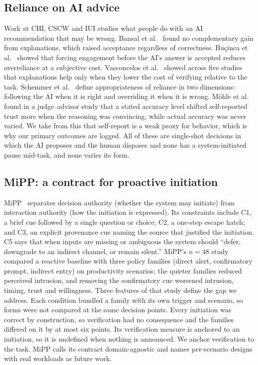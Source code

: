 \documentclass[manuscript,review]{acmart}
\begin{document}
\subsection{Reliance on AI advice}
Work at CHI, CSCW and IUI studies what people do with an AI recommendation
that may be wrong. Bansal et al.~\cite{bansal2021} found no complementary
gain from explanations, which raised acceptance regardless of correctness.
Bu\c{c}inca et al.~\cite{bucinca2021} showed that forcing engagement before
the AI's answer is accepted reduces overreliance at a subjective cost.
Vasconcelos et al.~\cite{vasconcelos2023} showed across five studies that
explanations help only when they lower the cost of verifying relative to
the task. Schemmer et al.~\cite{schemmer2023} define appropriateness of
reliance in two dimensions: following the AI when it is right and
overriding it when it is wrong. M\"ohle et al.~\cite{mohle2026} found in a
judge--advisor study that a stated accuracy level shifted self-reported
trust more when the reasoning was convincing, while actual accuracy was
never varied. We take from this that self-report is a weak proxy for
behavior, which is why our primary outcomes are logged. All of these are
single-shot decisions in which the AI proposes and the human disposes and none
has a system-initiated pause mid-task, and none varies its form.

\subsection{MiPP: a contract for proactive initiation}
MiPP~\cite{sanchezadame2026} separates decision authority (whether the
system may initiate) from interaction authority (how the initiation is
expressed). Its constraints include C1, a brief cue followed by a single
question or choice; C2, a one-step escape hatch; and C3, an explicit
provenance cue naming the source that justified the initiation. C5 says
that when inputs are missing or ambiguous the system should ``defer,
downgrade to an indirect channel, or remain silent.'' MiPP's $n{=}48$
study compared a reactive baseline with three policy families (direct
alert, confirmatory prompt, indirect entry) on productivity scenarios; the
quieter families reduced perceived intrusion, and removing the
confirmatory cue worsened intrusion, timing, trust and willingness. Three
features of that study define the gap we address. Each condition bundled a
family with its own trigger and scenario, so forms were not compared at the
same decision points. Every initiation was correct by construction, so
verification had no consequence and the families differed on it by at most
six points. Its verification measure is anchored to an initiation, so
it is undefined when nothing is announced. We anchor verification to the
task. MiPP calls its contract domain-agnostic and names per-scenario
designs with real workloads as future work.
\end{document}
